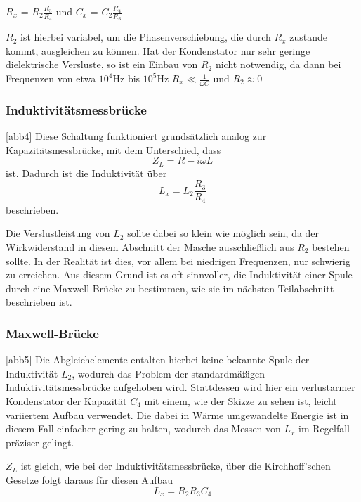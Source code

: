 $R_x$ = $R_2 \frac{R_3}{R_4}$ und 
$C_x$ = $C_2 \frac{R_4}{R_3}$

$R_2$ ist hierbei variabel, um die Phasenverschiebung, die durch $R_x$ zustande kommt, ausgleichen zu können.
Hat der Kondenstator nur sehr geringe dielektrische Versluste, so ist ein Einbau von $R_2$ nicht notwendig, 
da dann bei Frequenzen von etwa $10^4\si{\hertz}$ bis $10^5\si{\hertz}$ $R_x \ll \frac{1}{\omega C}$ und 
$R_2 \approx 0$

\subsubsection{Induktivitätsmessbrücke}

[abb4]
Diese Schaltung funktioniert grundsätzlich analog zur Kapazitätsmessbrücke, mit dem Unterschied, dass 
\begin{equation*}
    Z_L = R - i\omega L
\end{equation*}
ist. Dadurch ist die Induktivität über \begin{equation}
    L_x = L_2 \frac{R_3}{R_4}
\end{equation} beschrieben.

Die Verslustleistung von $L_2$ sollte dabei so klein wie möglich sein, da der Wirkwiderstand in diesem Abschnitt
der Masche
ausschließlich aus $R_2$ bestehen sollte. In der Realität ist dies, vor allem bei niedrigen Frequenzen, nur schwierig 
zu erreichen. Aus diesem Grund ist es oft sinnvoller, die Induktivität einer Spule durch eine Maxwell-Brücke zu 
bestimmen, wie sie im nächsten Teilabschnitt beschrieben ist.

\subsubsection{Maxwell-Brücke}

[abb5]
Die Abgleichelemente entalten hierbei keine bekannte Spule der Induktivität $L_2$, wodurch das Problem der 
standardmäßigen Induktivitätsmessbrücke aufgehoben wird. Stattdessen wird hier ein verlustarmer Kondenstator
der Kapazität $C_4$ mit einem, wie der Skizze zu sehen ist, leicht variiertem Aufbau verwendet. Die dabei
in Wärme umgewandelte Energie ist in diesem Fall einfacher gering zu halten, wodurch das Messen von $L_x$
im Regelfall präziser gelingt.

$Z_L$ ist gleich, wie bei der Induktivitätsmessbrücke, über die Kirchhoff'schen Gesetze folgt daraus für
diesen Aufbau \begin{equation}
    L_x = R_2 R_3 C_4
\end{equation}

